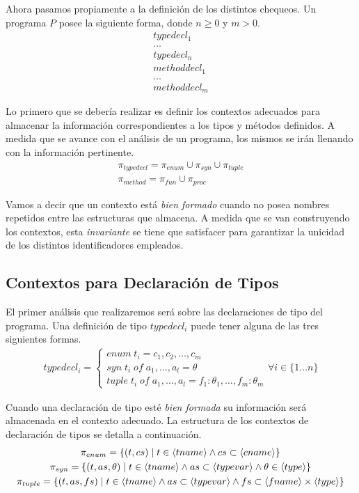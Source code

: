 \documentclass{article}
\begin{document}
Ahora pasamos propiamente a la definición de los distintos chequeos.
Un programa $P$ posee la siguiente forma, donde $n \geq 0$ y $m > 0$.
\begin{gather*}
typedecl_1 \\
\ldots \\
typedecl_n \\
methoddecl_1 \\
\ldots \\
methoddecl_m
\end{gather*}

Lo primero que se debería realizar es definir los contextos adecuados para almacenar la información correspondientes a los tipos y métodos definidos.
A medida que se avance con el análisis de un programa, los mismos se irán llenando con la información pertinente.
\begin{gather*}
\pi_{typedecl} = \pi_{enum} \cup \pi_{syn} \cup \pi_{tuple}
\\
\pi_{method} = \pi_{fun} \cup \pi_{proc}
\end{gather*}

Vamos a decir que un contexto está \textit{bien formado} cuando no posea nombres repetidos entre las estructuras que almacena.
A medida que se van construyendo los contextos, esta \textit{invariante} se tiene que satisfacer para garantizar la unicidad de los distintos identificadores empleados.

\subsection{Contextos para Declaración de Tipos}

El primer análisis que realizaremos será sobre las declaraciones de tipo del programa.
Una definición de tipo \textit{$typedecl_i$} puede tener alguna de las tres siguientes formas.
\begin{gather*}
typedecl_i =
\begin{cases*}
enum \; t_i = c_1, c_2, \ldots, c_m
\\
syn \; t_i \; of \; a_1, \ldots, a_l = \theta
\\
tuple \; t_i \; of\; a_1, \ldots, a_l = f_1: \theta_1, \ldots, f_m: \theta_m
\end{cases*}
\forall i \in \{ 1 \ldots n \}
\end{gather*}

Cuando una declaración de tipo esté \textit{bien formada} su información será almacenada en el contexto adecuado.
La estructura de los contextos de declaración de tipos se detalla a continuación.
\begin{gather*}
\pi_{enum} =
\{ 
(t, cs) \mid 
t \in \langle tname \rangle 
\wedge 
cs \subset \langle cname \rangle
\}
\\
\pi_{syn} =
\{
(t, as, \theta) \mid 
t \in \langle tname \rangle
\wedge
as \subset \langle typevar \rangle
\wedge
\theta \in \langle type \rangle
\}
\\
\pi_{tuple} =
\{
(t, as, fs) \mid
t \in \langle tname \rangle 
\wedge
as \subset \langle typevar \rangle
\wedge
fs \subset \langle fname \rangle \times \langle type \rangle
\}
\end{gather*}
\end{document}
